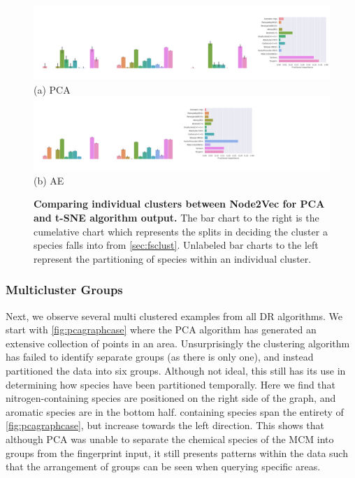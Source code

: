 \begin{landscape}
\begin{figure}[H]
         \includegraphics[width=1.6\textheight]{./outputs/PCA/node2vec/group.png}
         \\ (a) PCA \\
     \hfill
            \includegraphics[width=1.6\textheight]{./outputs/AE/node2vec/group.png}
        \\ (b) AE
        \caption{ \textbf{Comparing individual clusters between Node2Vec for PCA and t-SNE algorithm output.} The bar chart to the right is the cumelative chart which represents the splits in deciding the cluster a species falls into from \autoref{sec:fsclust}. Unlabeled bar charts to the left represent the partitioning of species within an individual cluster.}
        \label{fig:biN2V}
\end{figure}
\end{landscape}



\subsubsection{Multicluster Groups}\label{sec:multigroups}

Next, we observe several multi clustered examples from all DR algorithms. We start with \autoref{fig:pcagraphcase} where the PCA algorithm has generated an extensive collection of points in an area. Unsurprisingly the clustering algorithm has failed to identify separate groups (as there is only one), and instead partitioned the data into six groups. Although not ideal, this still has its use in determining how species have been partitioned temporally. Here we find that nitrogen-containing species are positioned on the right side of the graph, and aromatic species are in the bottom half.  containing species span the entirety of \autoref{fig:pcagraphcase}, but increase towards the left direction. This shows that although PCA was unable to separate the chemical species of the MCM into groups from the fingerprint input, it still presents patterns within the data such that the arrangement of groups can be seen when querying specific areas.





